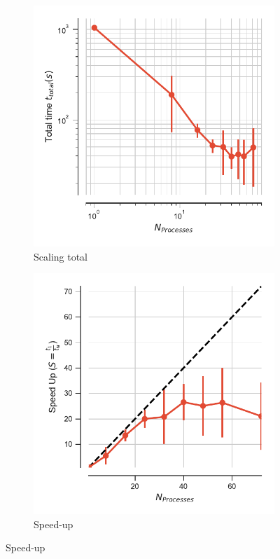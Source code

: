 \begin{figure}
\centering
\begin{subfigure}{.4\textwidth}
  \includegraphics[width=\linewidth]{figures/RMSD-ga4py-t_total.pdf}
  \caption{Scaling total}
  \label{fig:MPIscaling-ga4py}
\end{subfigure}
\hfill
\begin{subfigure}{.4\textwidth}
  \includegraphics[width=\linewidth]{figures/RMSD-ga4py-speed_up.pdf}
  \caption{Speed-up}
  \label{fig:MPIspeedup-ga4py}
\end{subfigure}
\bigskip


\end{figure}
